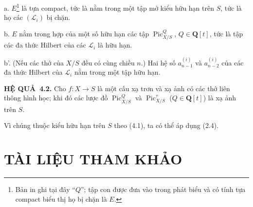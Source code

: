 \documentclass[11pt,twoside,openany]{book}
\numberwithin{equation}{section}
\newcommand{\src}[1]{%
  \phantomsection\hypertarget{src:\fgasourceid:#1}{}%
  \marginpar{\raggedleft\footnotesize\sffamily #1}%
}
\newcommand{\fgasourceid}{unset}
\newcommand{\result}[2]{\par\medskip\noindent\textbf{#1\if\relax\detokenize{#2}\relax\else\ #2\fi.}\quad}
\begin{document}
\noindent a. $E$\footnote{Bản in ghi tại đây ``$Q$''; tập con được đưa vào
trong phát biểu và có tính tựa compact biểu thị họ bị chặn là $E$.} là tựa
compact, tức là nằm trong một tập mở kiểu hữu hạn trên $S$, tức là họ các
$(\mathcal L_i)$ bị chặn.

\noindent b. $E$ nằm trong hợp của một số hữu hạn các tập
$\operatorname{Pic}_{X/S}^Q$, $Q\in\mathbf Q[t]$, tức là tập các đa thức
Hilbert của các $\mathcal L_i$ là hữu hạn.

\noindent b'. (Nếu các thớ của $X/S$ đều có cùng chiều $n$.) Hai hệ số
$a_{n-1}^{(i)}$ và $a_{n-2}^{(i)}$ của các đa thức Hilbert của
$\mathcal L_i$ nằm trong một tập hữu hạn.
\src{243}
\result{HỆ QUẢ}{4.2} Cho $f:X\longrightarrow S$ là một cấu xạ trơn và xạ ảnh
có các thớ liên thông hình học; khi đó các lược đồ
$\operatorname{Pic}_{X/S}^Q$ và $\operatorname{Pic}_{X/S}^\tau$
($Q\in\mathbf Q[t]$) là xạ ảnh trên $S$.

Vì chúng thuộc kiểu hữu hạn trên $S$ theo (4.1), ta có thể áp dụng (2.4).

\section*{TÀI LIỆU THAM KHẢO}
\end{document}
